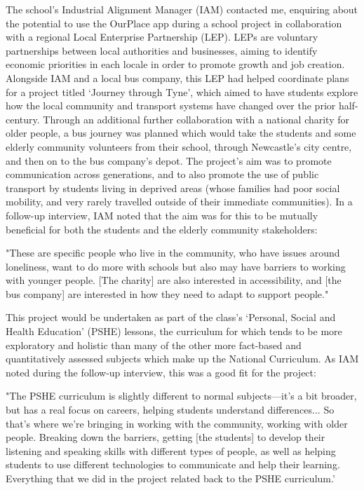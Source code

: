 The school's Industrial Alignment Manager (IAM) contacted me, enquiring about the potential to use the OurPlace app during a school project in collaboration with a regional Local Enterprise Partnership (LEP). LEPs are voluntary partnerships between local authorities and businesses, aiming to identify economic priorities in each locale in order to promote growth and job creation. Alongside IAM and a local bus company, this LEP had helped coordinate plans for a project titled `Journey through Tyne', which aimed to have students explore how the local community and transport systems have changed over the prior half-century. Through an additional further collaboration with a national charity for older people, a bus journey was planned which would take the students and some elderly community volunteers from their school, through Newcastle's city centre, and then on to the bus company's depot. The project's aim was to promote communication across generations, and to also promote the use of public transport by students living in deprived areas (whose families had poor social mobility, and very rarely travelled outside of their immediate communities). In a follow-up interview, IAM noted that the aim was for this to be mutually beneficial for both the students and the elderly community stakeholders:

\begin{displayquote}
"These are specific people who live in the community, who have issues around loneliness, want to do more with schools but also may have barriers to working with younger people. [The charity] are also interested in accessibility, and [the bus company] are interested in how they need to adapt to support people."
\end{displayquote}

This project would be undertaken as part of the class's `Personal, Social and Health Education' (PSHE) lessons, the curriculum for which tends to be more exploratory and holistic than many of the other more fact-based and quantitatively assessed subjects which make up the National Curriculum. As IAM noted during the follow-up interview, this was a good fit for the project:

\begin{displayquote}
"The PSHE curriculum is slightly different to normal subjects---it's a bit broader, but has a real focus on careers, helping students understand differences... So that's where we're bringing in working with the community, working with older people. Breaking down the barriers, getting [the students] to develop their listening and speaking skills with different types of people, as well as helping students to use different technologies to communicate and help their learning. Everything that we did in the project related back to the PSHE curriculum.'
\end{displayquote}

